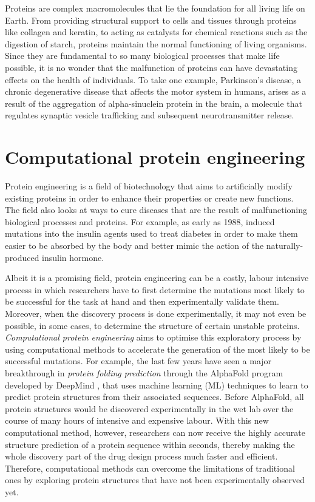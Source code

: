 Proteins are complex macromolecules that lie the foundation for all living life on Earth. From providing structural support to cells and tissues through proteins like collagen and keratin, to acting as catalysts for chemical reactions such as the digestion of starch, proteins maintain the normal functioning of living organisms. Since they are fundamental to so many biological processes that make life possible, it is no wonder that the malfunction of proteins can have devastating effects on the health of individuals. To take one example, Parkinson's disease, a chronic degenerative disease that affects the motor system in humans, arises as a result of the aggregation of alpha-sinuclein protein in the brain, a molecule that regulates synaptic vesicle trafficking and subsequent neurotransmitter release.

\section{Computational protein engineering}
Protein engineering is a field of biotechnology that aims to artificially modify existing proteins in order to enhance their properties or create new functions. The field also looks at ways to cure diseases that are the result of malfunctioning biological processes and proteins. For example, as early as 1988, \citet{insulin} induced mutations into the insulin agents used to treat diabetes in order to make them easier to be absorbed by the body and better mimic the action of the naturally-produced insulin hormone. 

Albeit it is a promising field, protein engineering can be a costly, labour intensive process in which researchers have to first determine the mutations most likely to be successful for the task at hand and then experimentally validate them. Moreover, when the discovery process is done experimentally, it may not even be possible, in some cases, to determine the structure of certain unstable proteins. \textit{Computational protein engineering} aims to optimise this exploratory process by using computational methods to accelerate the generation of the most likely to be successful mutations. For example, the last few years have seen a major breakthrough in \textit{protein folding prediction} through the AlphaFold program developed by DeepMind \cite{alphafold}, that uses machine learning (ML) techniques to learn to predict protein structures from their associated sequences. Before AlphaFold, all protein structures would be discovered experimentally in the wet lab over the course of many hours of intensive and expensive labour. With this new computational method, however, researchers can now receive the highly accurate structure prediction of a protein sequence within seconds, thereby making the whole discovery part of the drug design process much faster and efficient. Therefore, computational methods can overcome the limitations of traditional ones by exploring protein structures that have not been experimentally observed yet. 

